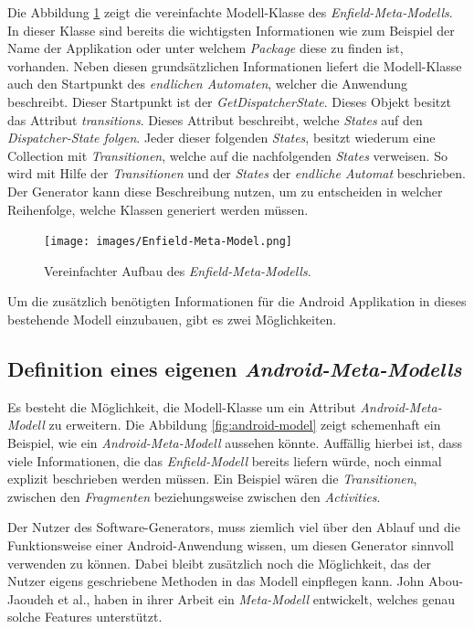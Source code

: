 Die Abbildung \ref{fig:enfield-model} zeigt die vereinfachte Modell-Klasse des \textit{Enfield-Meta-Modells}. 
In dieser Klasse sind bereits die wichtigsten Informationen wie zum Beispiel der Name der Applikation oder unter welchem \textit{Package} diese zu finden ist, vorhanden. Neben diesen grundsätzlichen Informationen liefert die Modell-Klasse auch den Startpunkt des \textit{endlichen Automaten}, welcher die Anwendung beschreibt. Dieser Startpunkt ist der \textit{GetDispatcherState}. Dieses Objekt besitzt das Attribut \textit{transitions}. Dieses Attribut beschreibt, welche \textit{States} auf den \textit{Dispatcher-State folgen}. Jeder dieser folgenden \textit{States}, besitzt wiederum eine Collection mit \textit{Transitionen}, welche auf die nachfolgenden \textit{States} verweisen. So wird mit Hilfe der \textit{Transitionen} und der \textit{States} der \textit{endliche Automat} beschrieben. Der Generator kann diese Beschreibung nutzen, um zu entscheiden in welcher Reihenfolge, welche Klassen generiert werden müssen.

\begin{figure}[H]
	\begin{center}
		\texttt{[image: images/Enfield-Meta-Model.png]}
		\caption{Vereinfachter Aufbau des \textit{Enfield-Meta-Modells}.}
		\label{fig:enfield-model}
	\end{center}
\end{figure}

Um die zusätzlich benötigten Informationen für die Android Applikation in dieses bestehende Modell einzubauen, gibt es zwei Möglichkeiten.

\subsection{Definition eines eigenen \textit{Android-Meta-Modells}}

Es besteht die Möglichkeit, die Modell-Klasse um ein Attribut \textit{Android-Meta-Modell} zu erweitern.
Die Abbildung \ref{fig:android-model} zeigt schemenhaft ein Beispiel, wie ein \textit{Android-Meta-Modell} aussehen könnte. Auffällig hierbei ist, dass viele Informationen, die das \textit{Enfield-Modell} bereits liefern würde, noch einmal explizit beschrieben werden müssen. Ein Beispiel wären die \textit{Transitionen}, zwischen den \textit{Fragmenten} beziehungsweise zwischen den \textit{Activities}. 


Der Nutzer des Software-Generators, muss ziemlich viel über den Ablauf und die Funktionsweise einer Android-Anwendung wissen, um diesen Generator sinnvoll verwenden zu können.
Dabei bleibt zusätzlich noch die Möglichkeit, das der Nutzer eigens geschriebene Methoden in das Modell einpflegen kann. John Abou-Jaoudeh et al., haben in ihrer Arbeit ein \textit{Meta-Modell} entwickelt, welches genau solche Features unterstützt\cite{abou2015high}.

